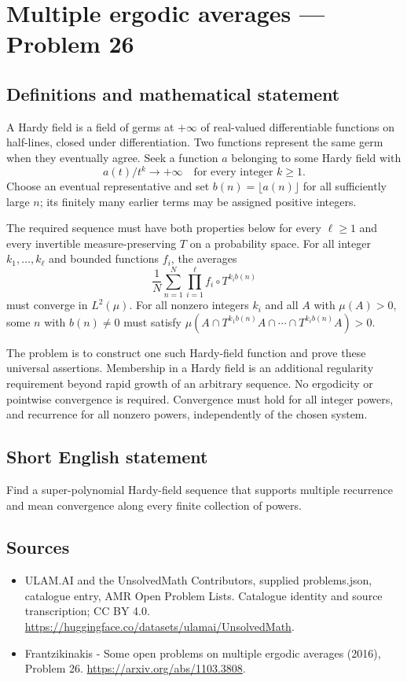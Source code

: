 \documentclass[11pt,a4paper]{article}
\begin{document}
\section*{Multiple ergodic averages — Problem 26}\label{statement}

\subsection{Definitions and mathematical statement}
A Hardy field is a field of germs at $+\infty$
of real-valued differentiable functions on half-lines,
closed under differentiation. Two functions represent
the same germ when they eventually agree. Seek
a function $a$ belonging to some Hardy field with
\[
                 a(t)/t^k\longrightarrow+\infty
                          \quad\text{for every integer }k\ge1.
\]
Choose an eventual representative and set
$b(n)=\lfloor a(n)\rfloor$ for all sufficiently
large $n$; its finitely many earlier terms may
be assigned positive integers.

The required sequence must have both properties
below for every $\ell\ge1$ and every invertible
measure-preserving $T$ on a probability space.
For all integer $k_1,\ldots,k_\ell$ and bounded
functions $f_i$, the averages
\[
           \frac1N\sum_{n=1}^N\prod_{i=1}^\ell
                           f_i\circ T^{k_i b(n)}
\]
must converge in $L^2(\mu)$. For all nonzero
integers $k_i$ and all $A$ with $\mu(A)>0$,
some $n$ with $b(n)\ne0$ must satisfy
$\mu(A\cap T^{k_1b(n)}A\cap\cdots\cap T^{k_\ell b(n)}A)>0$.

The problem is to construct one such Hardy-field
function and prove these universal assertions.
Membership in a Hardy field is an additional
regularity requirement beyond rapid growth of an
arbitrary sequence. No ergodicity or pointwise
convergence is required. Convergence must hold for
all integer powers, and recurrence for all nonzero
powers, independently of the chosen system.
\subsection{Short English statement}
Find a super-polynomial Hardy-field sequence that supports multiple recurrence and mean convergence along every finite collection of powers.
\subsection{Sources}
\begin{itemize}
\item[S1] ULAM.AI and the UnsolvedMath Contributors, supplied problems.json, catalogue entry, AMR Open Problem Lists. Catalogue identity and source transcription; CC BY 4.0.
\url{https://huggingface.co/datasets/ulamai/UnsolvedMath}.
\item[S2] Frantzikinakis - Some open problems on multiple ergodic averages (2016), Problem 26. 
\url{https://arxiv.org/abs/1103.3808}.
\end{itemize}
\end{document}
